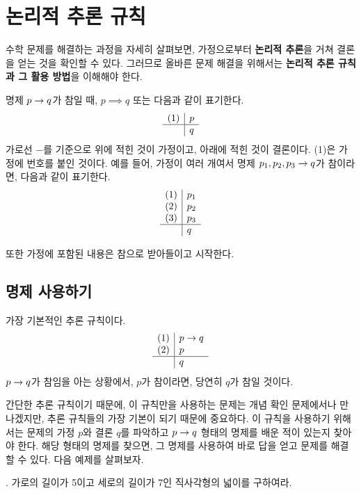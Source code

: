 \chapter{논리적 추론 규칙}

수학 문제를 해결하는 과정을 자세히 살펴보면, 가정으로부터 \textbf{논리적 추론}을 거쳐 결론을 얻는 것을 확인할 수 있다. 그러므로 올바른 문제 해결을 위해서는 \textbf{논리적 추론 규칙과 그 활용 방법}을 이해해야 한다.

명제 \(p \rightarrow q\)가 참일 때, \(p \implies q\) 또는 다음과 같이 표기한다.
\[
    \begin{array}{c|l}
        (1) & p \\\hline & q
    \end{array}
\]
가로선 \(-\)를 기준으로 위에 적힌 것이 가정이고, 아래에 적힌 것이 결론이다. (1)은 가정에 번호를 붙인 것이다. 예를 들어, 가정이 여러 개여서 명제 \(p_1, p_2, p_3 \rightarrow q\)가 참이라면, 다음과 같이 표기한다.
\[
    \begin{array}{c|l}
        (1) & p_1 \\ (2) & p_2 \\ (3) & p_3 \\\hline & q
    \end{array}
\]

또한 가정에 포함된 내용은 참으로 받아들이고 시작한다.

\pagebreak

\section{명제 사용하기}

가장 기본적인 추론 규칙이다.
\[
    \begin{array}{c|l}
        (1) & p \rightarrow q \\ (2) & p \\\hline & q
    \end{array}
\]
\(p \rightarrow q\)가 참임을 아는 상황에서, \(p\)가 참이라면, 당연히 \(q\)가 참일 것이다.

간단한 추론 규칙이기 때문에, 이 규칙만을 사용하는 문제는 개념 확인 문제에서나 만나겠지만, 추론 규칙들의 가장 기본이 되기 때문에 중요하다. 이 규칙을 사용하기 위해서는 문제의 가정 \(p\)와 결론 \(q\)를 파악하고 \(p \rightarrow q\) 형태의 명제를 배운 적이 있는지 찾아야 한다. 해당 형태의 명제를 찾으면, 그 명제를 사용하여 바로 답을 얻고 문제를 해결할 수 있다. 다음 예제를 살펴보자.

\bigskip

\ex. 가로의 길이가 5이고 세로의 길이가 7인 직사각형의 넓이를 구하여라.

